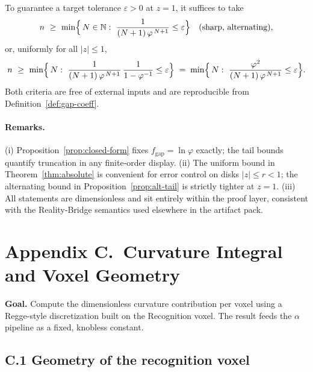 \documentclass[11pt]{article}
\begin{document}
\begin{proposition}
\begin{corollary}
\label{cor:budget}
To guarantee a target tolerance \(\varepsilon>0\) at \(z=1\), it suffices to take
\[
  n\ \ge\ \min\Bigl\{\,N\in\mathbb N:\ \frac{1}{(N+1)\,\varphi^{\,N+1}}\le\varepsilon\Bigr\}
  \quad\text{(sharp, alternating)},
\]
or, uniformly for all \(|z|\le1\),
\[
  n\ \ge\ \min\Bigl\{\,N:\ \frac{1}{(N+1)\,\varphi^{\,N+1}}\,
        \frac{1}{1-\varphi^{-1}}\le\varepsilon\Bigr\}
  \;=\;
  \min\Bigl\{\,N:\ \frac{\varphi^{2}}{(N+1)\,\varphi^{\,N+1}}\le\varepsilon\Bigr\}.
\]
Both criteria are free of external inputs and are reproducible from Definition~\ref{def:gap-coeff}.
\end{corollary}

\paragraph{Remarks.}
(i) Proposition~\ref{prop:closed-form} fixes \(f_{\mathrm{gap}}=\ln\varphi\) exactly; the tail bounds quantify truncation in any finite‑order display. (ii) The uniform bound in Theorem~\ref{thm:absolute} is convenient for error control on disks \(|z|\le r<1\); the alternating bound in Proposition~\ref{prop:alt-tail} is strictly tighter at \(z=1\). (iii) All statements are dimensionless and sit entirely within the proof layer, consistent with the Reality‑Bridge semantics used elsewhere in the artifact pack. %


\section*{Appendix C.\ Curvature Integral and Voxel Geometry}

\noindent
\textbf{Goal.} Compute the dimensionless curvature contribution per voxel using a Regge-style discretization built on the Recognition voxel. The result feeds the $\alpha$ pipeline as a fixed, knobless constant.

\subsection*{C.1  Geometry of the recognition voxel}


\end{proposition}
\end{document}
